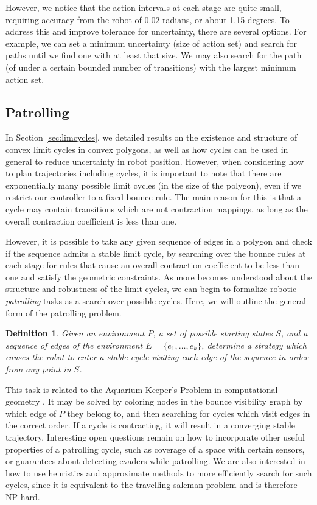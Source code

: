 \documentclass[sageh,times,Review]{sagej}
\newtheorem{definition}{Definition}
\begin{document}
However, we notice that the action intervals at each stage are quite small,
requiring accuracy from the robot of $0.02$ radians, or about 1.15 degrees. To
address this and improve tolerance for uncertainty, there are several options.
For example, we can set a minimum uncertainty (size of action set) and search for paths until
we find one with at least that size. We may also search for the path (of under a
certain bounded number of transitions) with the largest minimum action set.


\subsection{Patrolling}

In Section \ref{sec:limcycles}, we
detailed results on the existence and structure of convex limit cycles in convex
polygons, as well as how cycles can be used in general to reduce uncertainty in
robot position. However, when considering how to plan trajectories including
cycles, it is important to note that there are
exponentially many possible limit cycles (in the size of the polygon), even
if we restrict our controller to a fixed bounce rule. The
main reason for this is that a cycle may contain
transitions which are not contraction mappings, as long as the overall
contraction coefficient is less than one.

However, it is possible to take any given
sequence of edges in a polygon and check if the sequence admits a
stable limit cycle, by searching over the bounce rules at each stage for rules
that cause an overall contraction coefficient to be less than one and satisfy
the geometric constraints. As more becomes understood about the structure and robustness of
the limit cycles, we can begin to formalize robotic \emph{patrolling} tasks as a search
over possible cycles. Here, we will outline the general form of the patrolling
problem.

\begin{definition}
Given an environment $P$, a set of possible starting states $S$, and
a sequence of edges of the environment $E = \{e_1, \ldots, e_k\}$,
determine a strategy which causes the robot to enter a stable cycle visiting 
each edge of the sequence in order from any point in $S$.
\end{definition}

This task is related to the Aquarium Keeper's Problem in computational
geometry \cite{czyzowicz1991aquarium}. It may be solved by coloring nodes in the
bounce visibility graph by which edge of $P$ they belong to, and then searching
for cycles which visit edges in the correct order. If a cycle is
contracting, it will result in a converging stable trajectory. Interesting open questions 
remain on how to incorporate other useful properties of a
patrolling cycle, such as coverage of a space with certain sensors, or guarantees
about detecting evaders while patrolling. We are also interested in how to use
heuristics and approximate methods to more efficiently search for such cycles, since it
 is equivalent to the travelling saleman problem and is therefore NP-hard.
\end{document}
